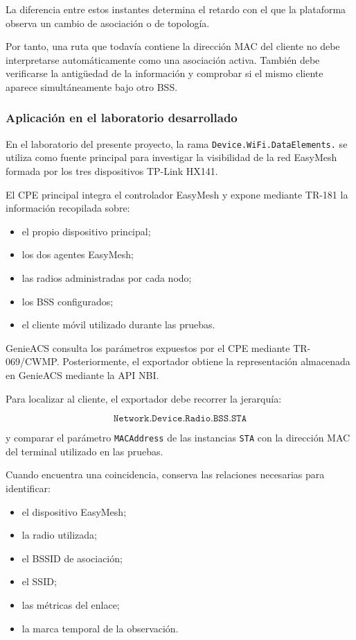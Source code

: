 La diferencia entre estos instantes determina el retardo con el que la
plataforma observa un cambio de asociación o de topología.

Por tanto, una ruta que todavía contiene la dirección MAC del cliente no
debe interpretarse automáticamente como una asociación activa. También
debe verificarse la antigüedad de la información y comprobar si el mismo
cliente aparece simultáneamente bajo otro BSS.

\subsubsection*{Aplicación en el laboratorio desarrollado}

En el laboratorio del presente proyecto, la rama
\texttt{Device.WiFi.DataElements.} se utiliza como fuente principal para
investigar la visibilidad de la red EasyMesh formada por los tres
dispositivos TP-Link HX141.

El CPE principal integra el controlador EasyMesh y expone mediante
TR-181 la información recopilada sobre:

\begin{itemize}
    \item el propio dispositivo principal;
    \item los dos agentes EasyMesh;
    \item las radios administradas por cada nodo;
    \item los BSS configurados;
    \item el cliente móvil utilizado durante las pruebas.
\end{itemize}

GenieACS consulta los parámetros expuestos por el CPE mediante
TR-069/CWMP. Posteriormente, el exportador obtiene la representación
almacenada en GenieACS mediante la API NBI.

Para localizar al cliente, el exportador debe recorrer la jerarquía:

\[
    \texttt{Network.Device.Radio.BSS.STA}
\]

y comparar el parámetro \texttt{MACAddress} de las instancias
\texttt{STA} con la dirección MAC del terminal utilizado en las pruebas.

Cuando encuentra una coincidencia, conserva las relaciones necesarias
para identificar:

\begin{itemize}
    \item el dispositivo EasyMesh;
    \item la radio utilizada;
    \item el BSSID de asociación;
    \item el SSID;
    \item las métricas del enlace;
    \item la marca temporal de la observación.
\end{itemize}

